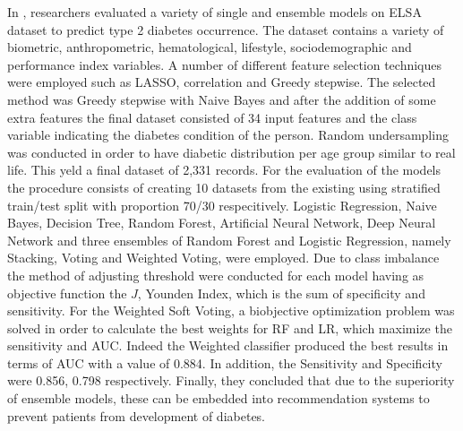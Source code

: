 \documentclass[journal,article,submit,pdftex,moreauthors]{Definitions/mdpi}
\begin{document}
\par In \cite{fazakis}, researchers evaluated a variety of single and ensemble models
on ELSA dataset to predict type 2 diabetes occurrence. The dataset contains a variety
of biometric, anthropometric, hematological, lifestyle, sociodemographic and performance 
index variables. A number of different feature selection techniques were employed
such as LASSO, correlation and Greedy stepwise. The selected method was Greedy
stepwise with Naive Bayes and after the addition of some extra features the final
dataset consisted of 34 input features and the class variable indicating the diabetes
condition of  the person. Random undersampling was conducted in order to have diabetic
distribution per age group similar to real life. This yeld a final dataset of 2,331
records. For the evaluation of the models the procedure consists of creating 
10 datasets from the existing using stratified train/test split with proportion 
70/30 respecitively. Logistic Regression, Naive Bayes, Decision Tree, Random Forest,
Artificial Neural Network, Deep Neural Network and three ensembles of Random Forest
and Logistic Regression, namely Stacking, Voting and Weighted Voting, were employed.
Due to class imbalance the method of adjusting threshold were conducted for each
model having as objective function the $J$, Younden Index, which is the sum of
specificity and sensitivity. For the Weighted Soft Voting, a biobjective
optimization problem was solved in order to calculate  the best weights for 
RF and LR, which maximize the sensitivity and AUC. Indeed the Weighted classifier
produced the best results in terms of AUC with a value of 0.884. In addition,
the Sensitivity and Specificity were 0.856, 0.798 respectively. Finally, they concluded that due to the superiority of ensemble 
models, these can be embedded into recommendation systems to prevent patients from development
of diabetes. 
\end{document}
